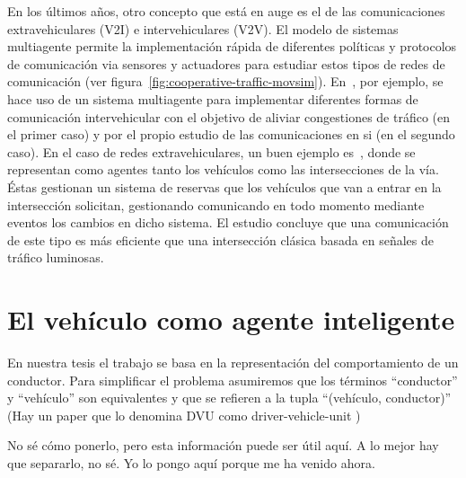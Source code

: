 {En los últimos años, otro concepto que está en auge es el de las comunicaciones extravehiculares (V2I) e intervehiculares (V2V). El modelo de sistemas multiagente permite la implementación rápida de diferentes políticas y protocolos de comunicación via sensores y actuadores para estudiar estos tipos de redes de comunicación (ver figura~\ref{fig:cooperative-traffic-movsim}). En~\cite{Shiose2001}\cite{Galis2000}, por ejemplo, se hace uso de un sistema multiagente para implementar diferentes formas de comunicación intervehicular con el objetivo de aliviar congestiones de tráfico (en el primer caso) y por el propio estudio de las comunicaciones en si (en el segundo caso). En el caso de redes extravehiculares, un buen ejemplo es~\cite{Dresner2004}, donde se representan como agentes tanto los vehículos como las intersecciones de la vía. Éstas gestionan un sistema de reservas que los vehículos que van a entrar en la intersección solicitan, gestionando  comunicando en todo momento mediante eventos los cambios en dicho sistema. El estudio concluye que una comunicación de este tipo es más eficiente que una intersección clásica basada en señales de tráfico luminosas.

\section{El vehículo como agente inteligente}

En nuestra tesis el trabajo se basa en la representación del comportamiento de un conductor. Para simplificar el problema asumiremos que los términos \enquote{conductor} y \enquote{vehículo} son equivalentes y que se refieren a la tupla \enquote{(vehículo, conductor)} (Hay un paper que lo denomina DVU como driver-vehicle-unit \cite{Dia2002})

No sé cómo ponerlo, pero esta información puede ser útil aquí. A lo mejor hay que separarlo, no sé. Yo lo pongo aquí porque me ha venido ahora.

}
